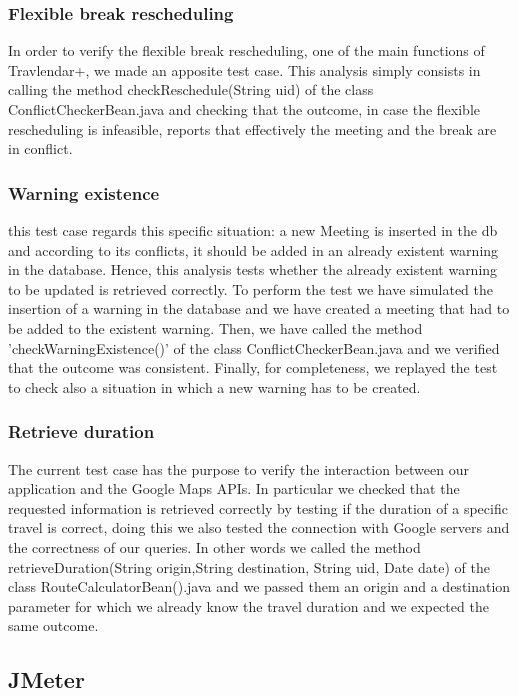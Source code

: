 \subsubsection{Flexible break rescheduling}
In order to verify the flexible break rescheduling, one of the main functions of Travlendar+, we made an apposite test case. This analysis simply consists in calling the method checkReschedule(String uid) of the class ConflictCheckerBean.java and checking that the outcome, in case the flexible rescheduling is infeasible, reports that effectively the meeting and the break are in conflict. 

\subsubsection{Warning existence }
this test case regards this specific situation: a new Meeting is inserted in the db and according to its conflicts, it should be added in an already existent warning in the database.  Hence, this analysis tests whether the already existent warning to be updated is retrieved correctly. To perform the test we have simulated the insertion of a warning in the database and we have created a meeting that had to be added to the existent warning. Then, we have called the method 'checkWarningExistence()' of the class ConflictCheckerBean.java and we verified that the outcome was consistent. 
Finally, for completeness, we replayed the test to check also a situation in which a new warning has to be created. 

\subsubsection{Retrieve duration}
The current test case has the purpose to verify the interaction between our application and the Google Maps APIs. In particular we checked that the requested information is retrieved correctly by testing if the duration of a specific travel is correct, doing this we also tested the connection with Google servers and the correctness of our queries. 
In other words we called the method retrieveDuration(String origin,String destination, String uid, Date date)  of the class RouteCalculatorBean().java and we passed them an origin and a destination parameter for which we already know the travel duration and we expected the same outcome. 

\clearpage
\subsection{JMeter}

